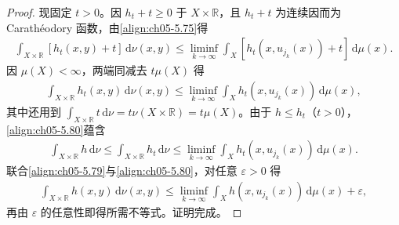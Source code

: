 \documentclass[../../main.tex]{subfiles}
\begin{document}
\begin{proof}
现固定 $t>0$。因 $h_t+t\geqslant0$ 于 $X\times\mathbb{R}$，且 $h_t+t$ 为连续因而为 Carathéodory 函数，由\eqref{align:ch05-5.75}得
\begin{align*}
\int_{X\times\mathbb{R}}[h_t(x,y)+t]\,\mathrm{d}\nu(x,y)
\leqslant\liminf_{k\to\infty}\int_X[h_t(x,u_{j_k}(x))+t]\,\mathrm{d}\mu(x).
\end{align*}
因 $\mu(X)<\infty$，两端同减去 $t\mu(X)$ 得
\begin{align}
\int_{X\times\mathbb{R}}h_t(x,y)\,\mathrm{d}\nu(x,y)
\leqslant\liminf_{k\to\infty}\int_Xh_t(x,u_{j_k}(x))\,\mathrm{d}\mu(x),\label{align:ch05-5.80}
\end{align}
其中还用到 $\int_{X\times\mathbb{R}}t\,\mathrm{d}\nu=t\nu(X\times\mathbb{R})=t\mu(X)$。由于 $h\leqslant h_t$（$t>0$），\eqref{align:ch05-5.80}蕴含
\begin{align*}
\int_{X\times\mathbb{R}}h\,\mathrm{d}\nu\leqslant\int_{X\times\mathbb{R}}h_t\,\mathrm{d}\nu
\leqslant\liminf_{k\to\infty}\int_Xh_t(x,u_{j_k}(x))\,\mathrm{d}\mu(x).
\end{align*}
联合\eqref{align:ch05-5.79}与\eqref{align:ch05-5.80}，对任意 $\varepsilon>0$ 得
\begin{align*}
\int_{X\times\mathbb{R}}h(x,y)\,\mathrm{d}\nu(x,y)
\leqslant\liminf_{k\to\infty}\int_Xh(x,u_{j_k}(x))\,\mathrm{d}\mu(x)+\varepsilon,
\end{align*}
再由 $\varepsilon$ 的任意性即得所需不等式。证明完成。
\end{proof}
\end{document}
